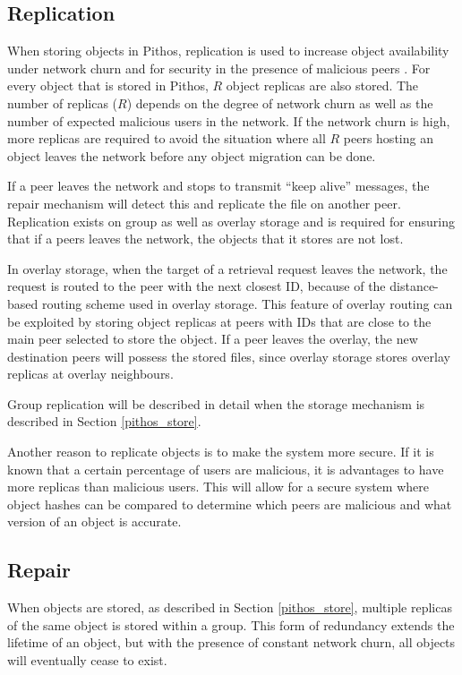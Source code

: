 \subsection{Replication}

When storing objects in Pithos, replication is used to increase object availability under network churn and for security in the presence of malicious peers \cite{storage_and_chaching_PAST}. For every object that is stored in Pithos, $R$ object replicas are also stored. The number of replicas ($R$) depends on the degree of network churn as well as the number of expected malicious users in the network. If the network churn is high, more replicas are required to avoid the situation where all $R$ peers hosting an object leaves the network before any object migration can be done.

If a peer leaves the network and stops to transmit ``keep alive'' messages, the repair mechanism will detect this and replicate the file on another peer. Replication exists on group as well as overlay storage and is required for ensuring that if a peers leaves the network, the objects that it stores are not lost.

In overlay storage, when the target of a retrieval request leaves the network, the request is routed to the peer with the next closest ID, because of the distance-based routing scheme used in overlay storage. This feature of overlay routing can be exploited by storing object replicas at peers with IDs that are close to the main peer selected to store the object. If a peer leaves the overlay, the new destination peers will possess the stored files, since overlay storage stores overlay replicas at overlay neighbours.

Group replication will be described in detail when the storage mechanism is described in Section \ref{pithos_store}.

Another reason to replicate objects is to make the system more secure. If it is known that a certain percentage of users are malicious, it is advantages to have more replicas than malicious users. This will allow for a secure system where object hashes can be compared to determine which peers are malicious and what version of an object is accurate.

\subsection{Repair}

When objects are stored, as described in Section \ref{pithos_store}, multiple replicas of the same object is stored within a group. This form of redundancy extends the lifetime of an object, but with the presence of constant network churn, all objects will eventually cease to exist.

